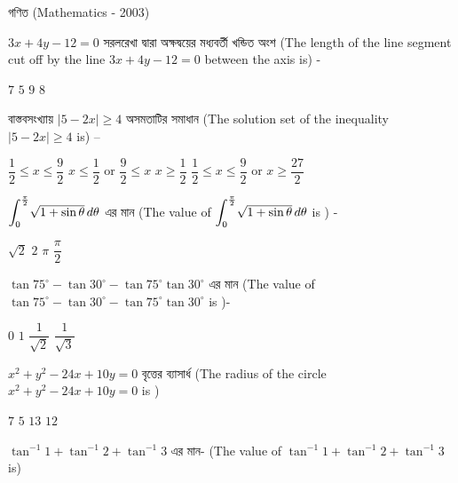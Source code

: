 \documentclass[addpoints]{exam}
\begin{document}
\begin{LARGE}
\begin{center}
গণিত (Mathematics - 2003)
\end{center}
\end{LARGE}
\begin{questions}

 \question $ 3x+4y-12=0 $ সরলরেখা দ্বারা অক্ষদ্বয়ের মধ্যবর্তী খন্ডিত অংশ (The length of the line segment cut off by the line $ 3x+4y-12=0 $ between the axis is) -

\begin{oneparchoices}
\choice $ 7 $
\choice $ 5 $
\choice $ 9 $
\choice $ 8 $
\end{oneparchoices}

\question বাস্তবসংখ্যায় $ |5-2x|\ge 4 $ অসমতাটির সমাধান (The solution set of the inequality $ |5-2x|\ge 4 $ is) – 

\begin{oneparchoices}
\choice $ \dfrac{1}{2}\le x \le \dfrac{9}{2}$
\choice $ x \le \dfrac{1}{2}$ or $\dfrac{9}{2}\le x$
\choice $ x\ge \dfrac{1}{2}$
\choice $\dfrac{1}{2}\le x \le \dfrac{9}{2}$ or $x\ge \dfrac{27}{2} $
\end{oneparchoices}

\question $ \mathlarger{\int_{0}^{\frac{\pi}{2}}}\sqrt{1+\sin\theta}\, d\theta $ এর মান (The value of $ \mathlarger{\int_{0}^{\frac{\pi}{2}}}\sqrt{1+\sin\theta}\, d\theta $ is ) -  

\begin{oneparchoices}
\choice $ \sqrt{2} $
\choice $ 2 $
\choice $ \pi $
\choice  $ \dfrac{\pi}{2} $
\end{oneparchoices}

\question $ \tan 75^{\circ}-\tan 30^{\circ} -\tan 75^{\circ}\tan 30^{\circ} $ এর মান (The value of $ \tan 75^{\circ}-\tan 30^{\circ} -\tan 75^{\circ}\tan 30^{\circ} $ is )- 

\begin{oneparchoices}
\choice $ 0 $
\choice $ 1 $
\choice $ \dfrac{1}{\sqrt{2}} $
\choice $ \dfrac{1}{\sqrt{3}} $
\end{oneparchoices}

\question $ x^{2}+y^{2}-24x+10y=0 $ বৃত্তের ব্যাসার্ধ (The radius of the circle $ x^{2}+y^{2}-24x+10y=0 $ is  ) 

\begin{oneparchoices}
\choice $ 7 $
\choice $ 5 $
\choice $ 13 $
\choice $ 12 $
\end{oneparchoices}


\question $ \tan^{-1}1+\tan^{-1} 2 +\tan^{-1} 3 $ এর মান- (The value of $ \tan^{-1}1+\tan^{-1} 2 +\tan^{-1} 3 $ is)


\end{questions}
\end{document}
